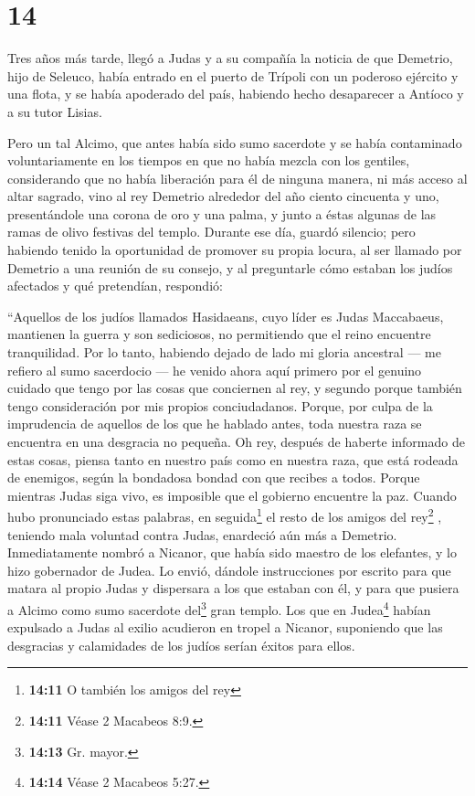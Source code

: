 \hypertarget{section-13}{%
\section{14}\label{section-13}}

 Tres años más tarde, llegó a Judas y a su compañía la
noticia de que Demetrio, hijo de Seleuco, había entrado en el puerto de
Trípoli con un poderoso ejército y una flota,  y se había
apoderado del país, habiendo hecho desaparecer a Antíoco y a su tutor
Lisias.

 Pero un tal Alcimo, que antes había sido sumo sacerdote y
se había contaminado voluntariamente en los tiempos en que no había
mezcla con los gentiles, considerando que no había liberación para él de
ninguna manera, ni más acceso al altar sagrado,  vino al
rey Demetrio alrededor del año ciento cincuenta y uno, presentándole una
corona de oro y una palma, y junto a éstas algunas de las ramas de olivo
festivas del templo. Durante ese día, guardó silencio; 
pero habiendo tenido la oportunidad de promover su propia locura, al ser
llamado por Demetrio a una reunión de su consejo, y al preguntarle cómo
estaban los judíos afectados y qué pretendían, respondió:

 ``Aquellos de los judíos llamados Hasidaeans, cuyo líder
es Judas Maccabaeus, mantienen la guerra y son sediciosos, no
permitiendo que el reino encuentre tranquilidad.  Por lo
tanto, habiendo dejado de lado mi gloria ancestral --- me refiero al
sumo sacerdocio --- he venido ahora aquí  primero por el
genuino cuidado que tengo por las cosas que conciernen al rey, y segundo
porque también tengo consideración por mis propios conciudadanos.
Porque, por culpa de la imprudencia de aquellos de los que he hablado
antes, toda nuestra raza se encuentra en una desgracia no pequeña.
 Oh rey, después de haberte informado de estas cosas,
piensa tanto en nuestro país como en nuestra raza, que está rodeada de
enemigos, según la bondadosa bondad con que recibes a todos.
 Porque mientras Judas siga vivo, es imposible que el
gobierno encuentre la paz.  Cuando hubo pronunciado estas
palabras, en seguida\footnote{\textbf{14:11} O también los amigos del
  rey} el resto de los amigos del rey\footnote{\textbf{14:11} Véase 2
  Macabeos 8:9.} , teniendo mala voluntad contra Judas, enardeció aún
más a Demetrio.  Inmediatamente nombró a Nicanor, que
había sido maestro de los elefantes, y lo hizo gobernador de Judea. Lo
envió,  dándole instrucciones por escrito para que matara
al propio Judas y dispersara a los que estaban con él, y para que
pusiera a Alcimo como sumo sacerdote del\footnote{\textbf{14:13} Gr.
  mayor.} gran templo.  Los que en Judea\footnote{\textbf{14:14}
  Véase 2 Macabeos 5:27.} habían expulsado a Judas al exilio acudieron
en tropel a Nicanor, suponiendo que las desgracias y calamidades de los
judíos serían éxitos para ellos.

